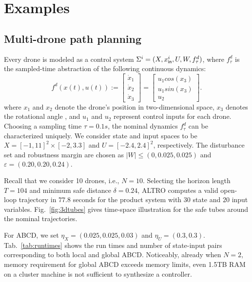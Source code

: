 \section{Examples}

\subsection{Multi-drone path planning}\label{sec:Multirobot}

Every drone is modeled as a control system $\Sigma^i=(X,x_{\mathsf{in}}^i,U,W,f^d_\tau)$, 
where $f^d_\tau$ is the sampled-time abstraction of the following continuous dynamics:
\begin{equation*}\label{eq:unicycle_ss}
	f^{d}(x(t),u(t)) :=
	\begin{bmatrix}
		\dot{x}_1\\
		\dot{x}_2\\
		\dot{x}_3
	\end{bmatrix}=
	\begin{bmatrix}
		u_1cos(x_3)\\
		u_1sin(x_3)\\
		u_2
	\end{bmatrix}.
\end{equation*}
where $x_1$ and $x_2$ denote the drone's position  in two-dimensional space, $x_3$ denotes the rotational angle , and $u_1$ and $u_2$ represent control inputs for each drone. Choosing a sampling time $\tau=0.1s$, the nominal dynamics $f^d_\tau$ can be characterized uniquely. 
We consider state and input spaces to be $X=[-1,11]^2\times[-2,3.3]$ and $U=[-2.4,2.4]^2$, respectively. 
The disturbance set and robustness margin are chosen as $|W|\leq (0,0.025,0.025)$ and $\varepsilon=(0.20,0.20,0.24)$.

Recall that we consider 10 drones, i.e., $N = 10$.
Selecting the horizon length $T=104$ and minimum safe distance $\delta=0.24$, ALTRO computes a valid open-loop trajectory 
in $77.8$ seconds for the product system with $30$ state and $20$ input variables.  
Fig.~\ref{fig:3dtubes} gives time-space illustration for the safe tubes around the nominal trajectories. 

For ABCD, we set  $\eta_{X}=(0.025,0.025,0.03)$ and $\eta_{U}=(0.3,0.3)$. 
Tab.~\ref{tab:runtimes} shows the run times and number of state-input pairs corresponding to both local and global ABCD. 
Noticeably, already when $N=2$, memory requirement for global ABCD exceeds memory limits, 
even 1.5TB RAM on a cluster machine is not sufficient to synthesize a controller.

